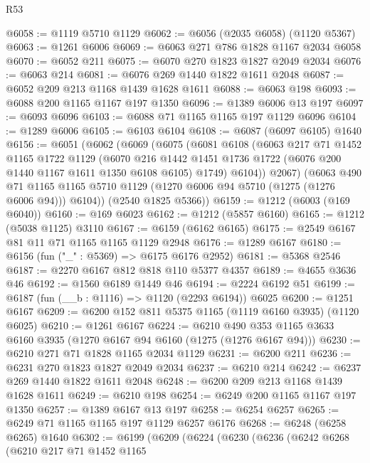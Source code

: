 \begin{lexlean}{R53}
\begin{coremodule}
@6058 := @1119 @5710 @1129
@6062 := @6056 (@2035 @6058) (@1120 @5367)
@6063 := @1261 @6006
@6069 := @6063 @271 @786 @1828 @1167 @2034 @6058
@6070 := @6052 @211
@6075 := @6070 @270 @1823 @1827 @2049 @2034
@6076 := @6063 @214
@6081 := @6076 @269 @1440 @1822 @1611 @2048
@6087 := @6052 @209 @213 @1168 @1439 @1628 @1611
@6088 := @6063 @198
@6093 := @6088 @200 @1165 @1167 @197 @1350
@6096 := @1389 @6006 @13 @197
@6097 := @6093 @6096
@6103 := @6088 @71 @1165 @1165 @197 @1129 @6096
@6104 := @1289 @6006
@6105 := @6103 @6104
@6108 := @6087 (@6097 @6105) @1640
@6156 := @6051
    (@6062
      (@6069
        (@6075
          (@6081
            @6108
            (@6063
              @217
              @71
              @1452
              @1165
              @1722
              @1129
              (@6070
                @216
                @1442
                @1451
                @1736
                @1722
                (@6076 @200 @1440 @1167 @1611 @1350 @6108 @6105)
                @1749)
              @6104))
          @2067)
        (@6063
          @490
          @71
          @1165
          @1165
          @5710
          @1129
          (@1270 @6006 @94 @5710 (@1275 (@1276 @6006 @94)))
          @6104))
      (@2540 @1825 @5366))
@6159 := @1212 (@6003 (@169 @6040))
@6160 := @169 @6023
@6162 := @1212 (@5857 @6160)
@6165 := @1212 (@5038 @1125) @3110
@6167 := @6159 (@6162 @6165)
@6175 := @2549 @6167 @81 @11 @71 @1165 @1165 @1129 @2948
@6176 := @1289 @6167
@6180 := @6156 (fun ("_" : @5369) => @6175 @6176 @2952)
@6181 := @5368 @2546
@6187 := @2270 @6167 @812 @818 @110 @5377 @4357
@6189 := @4655 @3636 @46
@6192 := @1560 @6189 @1449 @46
@6194 := @2224 @6192 @51
@6199 := @6187 (fun (__b : @1116) => @1120 (@2293 @6194)) @6025
@6200 := @1251 @6167
@6209 := @6200 @152 @811 @5375 @1165 (@1119 @6160 @3935) (@1120 @6025)
@6210 := @1261 @6167
@6224 := @6210 @490 @353 @1165 @3633 @6160 @3935 (@1270 @6167 @94 @6160 (@1275 (@1276 @6167 @94)))
@6230 := @6210 @271 @71 @1828 @1165 @2034 @1129
@6231 := @6200 @211
@6236 := @6231 @270 @1823 @1827 @2049 @2034
@6237 := @6210 @214
@6242 := @6237 @269 @1440 @1822 @1611 @2048
@6248 := @6200 @209 @213 @1168 @1439 @1628 @1611
@6249 := @6210 @198
@6254 := @6249 @200 @1165 @1167 @197 @1350
@6257 := @1389 @6167 @13 @197
@6258 := @6254 @6257
@6265 := @6249 @71 @1165 @1165 @197 @1129 @6257 @6176
@6268 := @6248 (@6258 @6265) @1640
@6302 := @6199
    (@6209
      (@6224
        (@6230
          (@6236
            (@6242
              @6268
              (@6210
                @217
                @71
                @1452
                @1165

\end{coremodule}
\end{lexlean}
